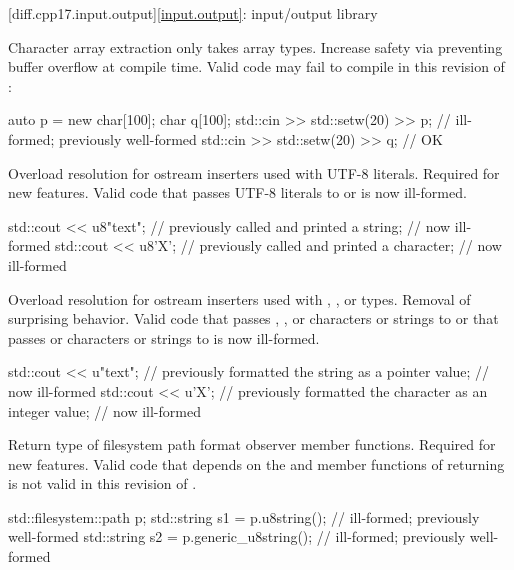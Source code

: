 [diff.cpp17.input.output]{\ref{input.output}: input/output library}

\change
Character array extraction only takes array types.
\rationale
Increase safety via preventing buffer overflow at compile time.
\effect
Valid \CppXVII{} code may fail to compile in this revision of \Cpp{}:
\begin{codeblock}
auto p = new char[100];
char q[100];
std::cin >> std::setw(20) >> p;         // ill-formed; previously well-formed
std::cin >> std::setw(20) >> q;         // OK
\end{codeblock}

%
\change
Overload resolution for ostream inserters used with UTF-8 literals.
\rationale
Required for new features.
\effect
Valid \CppXVII{} code that passes UTF-8 literals to
 or
 is now ill-formed.
\begin{codeblock}
std::cout << u8"text";          // previously called  and printed a string;
                                // now ill-formed
std::cout << u8'X';             // previously called  and printed a character;
                                // now ill-formed
\end{codeblock}

\change
Overload resolution for ostream inserters
used with , , or  types.
\rationale
Removal of surprising behavior.
\effect
Valid \CppXVII{} code that passes
, , or  characters or strings
to  or
that passes  or  characters or strings
to  is now ill-formed.
\begin{codeblock}
std::cout << u"text";           // previously formatted the string as a pointer value;
                                // now ill-formed
std::cout << u'X';              // previously formatted the character as an integer value;
                                // now ill-formed
\end{codeblock}

\change
Return type of filesystem path format observer member functions.
\rationale
Required for new features.
\effect
Valid \CppXVII{} code that depends on the  and
 member functions of 
returning  is not valid in this revision of \Cpp{}.
\begin{codeblock}
std::filesystem::path p;
std::string s1 = p.u8string();          // ill-formed; previously well-formed
std::string s2 = p.generic_u8string();  // ill-formed; previously well-formed
\end{codeblock}

